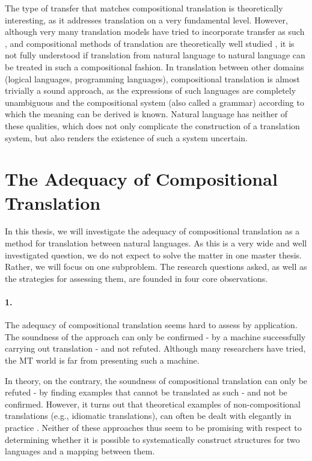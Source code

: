 The type of transfer that matches compositional translation is theoretically interesting, as it addresses translation on a very fundamental level. However, although very many translation models have tried to incorporate transfer as such \citep[e.g.,][]{wu1997stochastic,chiang2005hierarchical}, and compositional methods of translation are theoretically well studied \citep[e.g.,][]{janssen1996compositionality}, it is not fully understood if translation from natural language to natural language can be treated in such a compositional fashion. In translation between other domains (logical languages, programming languages), compositional translation is almost trivially a sound approach, as the expressions of such languages are completely unambiguous and the compositional system (also called a grammar) according to which the meaning can be derived is known. Natural language has neither of these qualities, which does not only complicate the construction of a translation system, but also renders the existence of such a system uncertain.

\section*{The Adequacy of Compositional Translation}

In this thesis, we will investigate the adequacy of compositional translation as a method for translation between natural languages. As this is a very wide and well investigated question, we do not expect to solve the matter in one master thesis. Rather, we will focus on one subproblem. The research questions asked, as well as the strategies for assessing them, are founded in four core observations.

\paragraph{1.} The adequacy of compositional translation seems hard to assess by application. The soundness of the approach can only be confirmed - by a machine successfully carrying out translation - and not refuted. Although many researchers have tried, the MT world is far from presenting such a machine.

In theory, on the contrary, the soundness of compositional translation can only be refuted - by finding examples that cannot be translated as such - and not be confirmed. However, it turns out that theoretical examples of non-compositional translations (e.g., idiomatic translations), can often be dealt with elegantly in practice \citep{janssen1996compositionality}. Neither of these approaches thus seem to be promising with respect to determining whether it is possible to systematically construct structures for two languages and a mapping between them.

